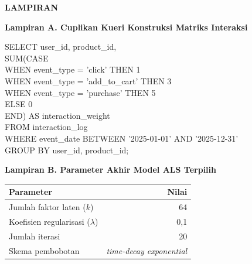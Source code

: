 \newpage
\begin{center}
{\bfseries\color{uinavy}\large LAMPIRAN}
\end{center}
\vspace{0.4cm}

\noindent
\textbf{Lampiran A. Cuplikan Kueri Konstruksi Matriks Interaksi}

\begin{tcolorbox}[
  colback=uinavy, colframe=uinavy, arc=1pt,
  left=8pt, right=8pt, top=6pt, bottom=6pt,
  fontupper=\footnotesize\ttfamily\color{white}
]
SELECT user\_id, product\_id,\\{}
\phantom{xx}SUM(CASE\\{}
\phantom{xxxx}WHEN event\_type = 'click' THEN 1\\{}
\phantom{xxxx}WHEN event\_type = 'add\_to\_cart' THEN 3\\{}
\phantom{xxxx}WHEN event\_type = 'purchase' THEN 5\\{}
\phantom{xxxx}ELSE 0\\{}
\phantom{xx}END) AS interaction\_weight\\{}
FROM interaction\_log\\{}
WHERE event\_date BETWEEN '2025-01-01' AND '2025-12-31'\\{}
GROUP BY user\_id, product\_id;
\end{tcolorbox}

\vspace{0.6cm}
\noindent
\textbf{Lampiran B. Parameter Akhir Model ALS Terpilih}

\begin{center}
\begin{tabularx}{0.7\textwidth}{@{}Xr@{}}
\toprule
\textbf{Parameter} & \textbf{Nilai} \\
\midrule
Jumlah faktor laten ($k$) & 64 \\
Koefisien regularisasi ($\lambda$) & 0,1 \\
Jumlah iterasi & 20 \\
Skema pembobotan & \emph{time-decay exponential} \\
\bottomrule
\end{tabularx}
\end{center}

